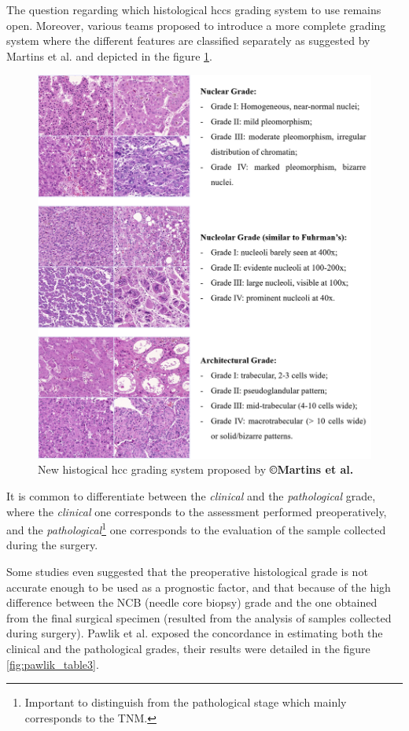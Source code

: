 The question regarding which histological \ac{hcc}s grading system to use
remains open. Moreover, various teams proposed to introduce a more
complete grading system where the different features are classified
separately as suggested by Martins et al. and depicted in the
figure \ref{fig:martins2017_fig5}.

\begin{figure}[th!]
\centering
\includegraphics[width=0.9\linewidth]{images/martins2017_fig5}
\caption{New histogical \ac{hcc} grading system proposed by \textbf{©Martins et al. \cite{Martins2017}}}
\label{fig:martins2017_fig5}
\end{figure}


It is common to differentiate between the \emph{clinical} and the
\emph{pathological} grade, where the \emph{clinical} one corresponds to the assessment
performed preoperatively, and the \emph{pathological}\footnote{Important to distinguish from the pathological stage which mainly corresponds to the TNM.} one corresponds to the evaluation
of the sample collected during the surgery.

Some studies even suggested that the preoperative histological grade is
not accurate enough to be used as a prognostic factor, and that because
of the high difference between the NCB (needle core biopsy) grade and the
one obtained from the final surgical specimen (resulted from the
analysis of samples collected during surgery). Pawlik et al.
exposed the concordance in estimating both the clinical and the pathological grades, their results were detailed in the figure \ref{fig:pawlik_table3}.

